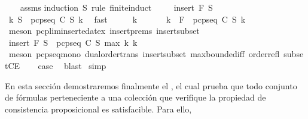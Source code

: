 \begin{isabellebody}
%
\isadelimproof
\ \ %
\endisadelimproof
%
\isatagproof
{}\isamarkupfalse%
\ assms\isanewline
{}\isamarkupfalse%
{\isacharparenleft}induction\ S{\isacharprime}\ rule{\isacharcolon}\ finite{\isacharunderscore}induct{\isacharparenright}\ \isanewline
\ \ \isamarkupfalse%
\ {\isacharparenleft}insert\ F\ S{\isacharprime}{\isacharparenright}\isanewline
\ \ \isamarkupfalse%
\ {\isachardoublequoteopen}{\isasymexists}k{\isachardot}\ S{\isacharprime}\ {\isasymsubseteq}\ pcp{\isacharunderscore}seq\ C\ S\ k{\isachardoublequoteclose}\ \isamarkupfalse%
\ fast\isanewline
\ \ \isamarkupfalse%
\ \isamarkupfalse%
\ k{}\ \isacommand{{\isachardot}{\isachardot}}\isamarkupfalse%
\isanewline
\ \ \isamarkupfalse%
\ \isamarkupfalse%
\ k{}\ \ {\isachardoublequoteopen}F\ {\isasymin}\ pcp{\isacharunderscore}seq\ C\ S\ k{}{\isachardoublequoteclose}\isanewline
\ \ \ \ \isamarkupfalse%
\ {\isacharparenleft}meson\ pcp{\isacharunderscore}lim{\isacharunderscore}inserted{\isacharunderscore}at{\isacharunderscore}ex\ insert{\isachardot}prems\ insert{\isacharunderscore}subset{\isacharparenright}\isanewline
\ \ \isamarkupfalse%
\ \isamarkupfalse%
\ {\isachardoublequoteopen}insert\ F\ S{\isacharprime}\ {\isasymsubseteq}\ pcp{\isacharunderscore}seq\ C\ S\ {\isacharparenleft}max\ k{}\ k{}{\isacharparenright}{\isachardoublequoteclose}\isanewline
\ \ \ \ \isamarkupfalse%
\ {\isacharparenleft}meson\ pcp{\isacharunderscore}seq{\isacharunderscore}mono\ dual{\isacharunderscore}order{\isachardot}trans\ insert{\isacharunderscore}subset\ max{\isachardot}bounded{\isacharunderscore}iff\ order{\isacharunderscore}refl\ subsetCE{\isacharparenright}\isanewline
\ \ \isamarkupfalse%
\ {\isacharquery}case\ \isamarkupfalse%
\ blast\isanewline
{}\isamarkupfalse%
\ simp%
\endisatagproof
{\isafoldproof}%
%
\isadelimproof
%
\endisadelimproof
%
\isadelimdocument
%
\endisadelimdocument
%
\isatagdocument
%
\isamarkuptrue%
%
\endisatagdocument
{\isafolddocument}%
%
\isadelimdocument
%
\endisadelimdocument
%
\begin{isamarkuptext}%
En esta sección demostraremos finalmente el 
  , el cual prueba que todo conjunto de fórmulas perteneciente a 
  una colección que verifique la propiedad de consistencia proposicional es satisfacible. Para ello, 

\end{isamarkuptext}
\end{isabellebody}
